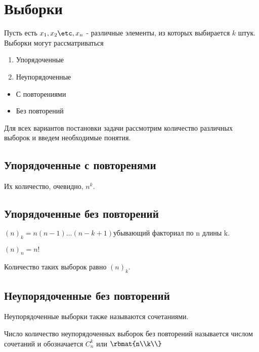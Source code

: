 \documentclass[unicode,10pt]{article}
\begin{document}
\section{Выборки}
Пусть есть $\set[x]{n}$ - различные элементы, из которых выбирается $k$ штук.
Выборки могут рассматриваться\par
\begin{enumerate}
  \item Упорядоченные
  \item Неупорядоченные
\end{enumerate}
\begin{itemize}
  \item С повторениями
  \item Без повторений
\end{itemize}
Для всех вариантов постановки задачи рассмотрим количество различных выборок и
введем необходимые понятия.
\subsection{Упорядоченные с повторенями}
Их количество, очевидно, $n^k$.
\subsection{Упорядоченные без повторений}
\begin{df}
  $\displaystyle (n)_k=n(n-1)\ldots(n-k+1) \text{убывающий факториал по n длины k.}$
\end{df}
\begin{note}
  $\displaystyle (n)_n=n!$
\end{note}
Количество таких выборок равно $(n)_k$.
\subsection{Неупорядоченные без повторений}
\begin{note}
  Неупорядоченные выборки также называются сочетаниями.
\end{note}
\begin{df}
  Число количество неупорядоченных выборок без повторений называется числом сочетаний
  и обозначается $C_n^k$ или $\rbmat{n\\k\\}$
\end{df}
\end{document}
